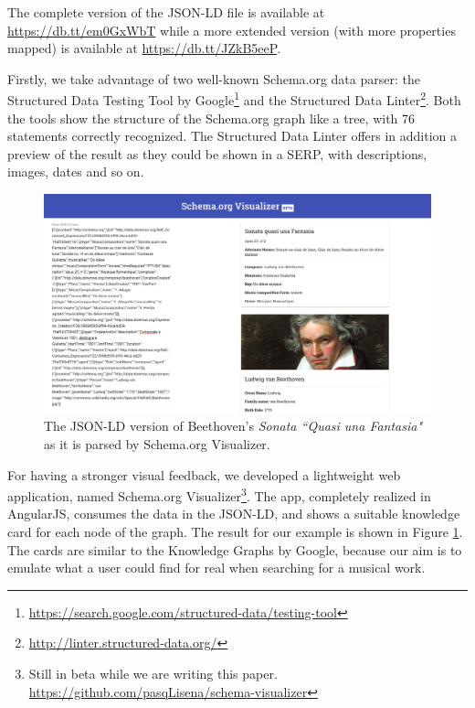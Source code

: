 \documentclass{llncs}
\begin{document}
The complete version of the JSON-LD file is available at \url{https://db.tt/em0GxWbT} while a more extended version (with more properties mapped) is available at \url{https://db.tt/JZkB5eeP}.

Firstly, we take advantage of two well-known Schema.org data parser: the Structured Data Testing Tool by Google\footnote{\url{https://search.google.com/structured-data/testing-tool}} and the Structured Data Linter\footnote{\url{http://linter.structured-data.org/}}. Both the tools show the structure of the Schema.org graph like a tree, with 76 statements correctly recognized. The Structured Data Linter offers in addition a preview of the result as they could be shown in a SERP, with descriptions, images, dates and so on.

\begin{figure}
\includegraphics[width=12cm]{img/schema-visualizer.png}
\centering
\caption{The JSON-LD version of Beethoven's \textit{Sonata ``Quasi una Fantasia"} as it is parsed by Schema.org Visualizer.}
\label{fig:schema-visualizer}
\end{figure}

For having a stronger visual feedback, we developed a lightweight web application, named Schema.org Visualizer\footnote{Still in beta while we are writing this paper. \url{https://github.com/pasqLisena/schema-visualizer}}. The app, completely realized in AngularJS, consumes the data in the JSON-LD, and shows a suitable knowledge card for each node of the graph. The result for our example is shown in Figure \ref{fig:schema-visualizer}. The cards are similar to the Knowledge Graphs by Google, because our aim is to emulate what a user could find for real when searching for a musical work.


\end{document}
